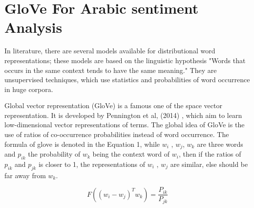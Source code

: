 \documentclass[conference]{IEEEtran}
\begin{document}
\section{GloVe For Arabic sentiment Analysis}
In literature, there are several models available for distributional word representations; these models are based on the linguistic hypothesis "Words that occurs in the same context tends to have the same meaning." They are unsupervised techniques, which use statistics and probabilities of word occurrence in huge corpora.

Global vector representation (GloVe) is a famous one of the space vector representation.  It is developed by Pennington et al, (2014) \cite{8318770}, which aim to learn low-dimensional vector representations of terms. The global idea of GloVe is the use of ratios of co-occurrence probabilities instead of word occurrence. The formula of glove is denoted in the Equation 1, while $w_{i}$ ,  $w_{j}$,  $w_{k}$ are three words and  $p_{ik}$ the probability of  $w_{k}$ being the context word of  $w_{i}$, then if the ratios of   $p_{ik}$ and  $p_{jk}$ is closer to 1, the representations of   $w_{i}$ ,  $w_{j}$ are similar, else should be far away from  $w_{k}$.

\begin{equation}
F((w_{i}-w_{j})^Tw_{k}) =\frac{P_{ik}}{P_{jk}}\label{Pr}
\end{equation}
\end{document}
